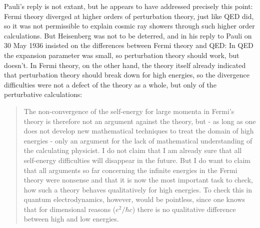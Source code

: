 \documentclass[12pt,a4paper]{article}
\begin{document}
Pauli's reply is not extant, but he appears to have addressed precisely this point: Fermi theory diverged at higher orders of perturbation theory, just like QED did, so it was not permissible to explain cosmic ray showers through such higher order calculations. But Heisenberg was not to be deterred, and in his reply to Pauli on 30 May 1936 insisted on the differences between Fermi theory and QED: In QED the expansion parameter was small, so perturbation theory should work, but doesn't. In Fermi theory, on the other hand, the theory itself already indicated that perturbation theory should break down for high energies, so the divergence difficulties were not a defect of the theory as a whole, but only of the perturbative calculations:

\begin{quote}
The non-convergence of the self-energy for large momenta in Fermi's theory is therefore not an argument against the theory, but - as long as one does not develop new mathematical techniques to treat the domain of high energies - only an argument for the lack of mathematical understanding of the calculating physicist. I do not claim that I am already sure that all self-energy difficulties will disappear in the future. But I do want to claim that all arguments so far concerning the infinite energies in the Fermi theory were nonsense and that it is now the most important task to check, how such a theory behaves qualitatively for high energies. To check this in quantum electrodynamics, however, would be pointless, since one knows that for dimensional reasons ($e^2/\hbar c$) there is no qualitative difference between high and low energies.
\end{quote} 
\end{document}
